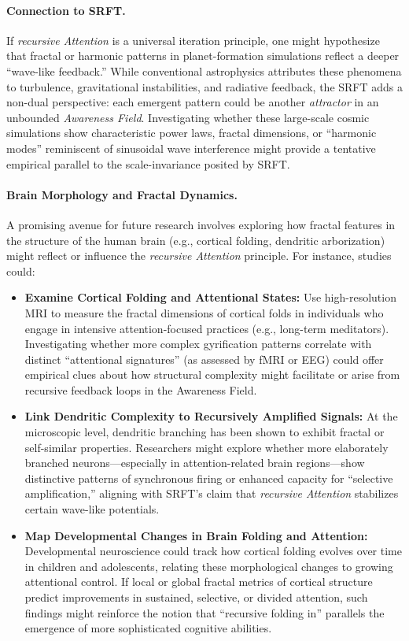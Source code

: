 \documentclass[12pt,a4paper]{article}
\begin{document}
\paragraph{Connection to SRFT.}
If \emph{recursive Attention} is a universal iteration principle, one might hypothesize that fractal or harmonic patterns in planet-formation simulations reflect a deeper “wave-like feedback.” While conventional astrophysics attributes these phenomena to turbulence, gravitational instabilities, and radiative feedback, the SRFT adds a non-dual perspective: each emergent pattern could be another \emph{attractor} in an unbounded \emph{Awareness Field}. Investigating whether these large-scale cosmic simulations show characteristic power laws, fractal dimensions, or “harmonic modes” reminiscent of sinusoidal wave interference might provide a tentative empirical parallel to the scale-invariance posited by SRFT.

\paragraph{Brain Morphology and Fractal Dynamics.} 
A promising avenue for future research involves exploring how fractal features in the structure of the human brain (e.g., cortical folding, dendritic arborization) might reflect or influence the \emph{recursive Attention} principle. For instance, studies could:

\begin{itemize}
    \item \textbf{Examine Cortical Folding and Attentional States:} 
    Use high-resolution MRI to measure the fractal dimensions of cortical folds in individuals who engage in intensive attention-focused practices (e.g., long-term meditators). Investigating whether more complex gyrification patterns correlate with distinct “attentional signatures” (as assessed by fMRI or EEG) could offer empirical clues about how structural complexity might facilitate or arise from recursive feedback loops in the Awareness Field.

    \item \textbf{Link Dendritic Complexity to Recursively Amplified Signals:} 
    At the microscopic level, dendritic branching has been shown to exhibit fractal or self-similar properties. Researchers might explore whether more elaborately branched neurons—especially in attention-related brain regions—show distinctive patterns of synchronous firing or enhanced capacity for “selective amplification,” aligning with SRFT’s claim that \emph{recursive Attention} stabilizes certain wave-like potentials.

    \item \textbf{Map Developmental Changes in Brain Folding and Attention:}
    Developmental neuroscience could track how cortical folding evolves over time in children and adolescents, relating these morphological changes to growing attentional control. If local or global fractal metrics of cortical structure predict improvements in sustained, selective, or divided attention, such findings might reinforce the notion that “recursive folding in” parallels the emergence of more sophisticated cognitive abilities.
\end{itemize}
\end{document}
